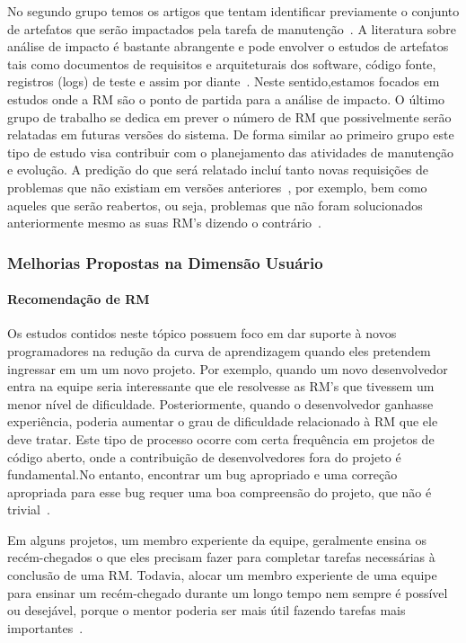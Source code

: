 No segundo grupo temos os artigos que tentam identificar previamente o conjunto
de artefatos que serão impactados pela tarefa de manutenção~\cite{Nagwani2010,
	ahsan2010impact}. A literatura sobre análise de impacto é bastante
abrangente e pode envolver o estudos de artefatos tais como documentos de
requisitos e arquiteturais dos software, código fonte, registros (logs) de teste
e assim por diante~\cite{cavalcanti2014challenges}. Neste sentido,estamos
focados em estudos onde a RM são o ponto de partida para a análise de impacto.
O último grupo de trabalho se dedica em prever o número de RM que possivelmente serão relatadas em futuras versões do sistema. De forma similar ao primeiro
grupo este tipo de estudo visa contribuir com o planejamento das atividades de
manutenção e evolução. A predição do que será relatado incluí tanto novas
requisições de problemas que não existiam em versões
anteriores~\cite{song2006software}, por exemplo, bem como aqueles que serão
reabertos, ou seja, problemas que não foram solucionados anteriormente mesmo as
suas RM's dizendo o contrário~\cite{xia2015automatic}.

\subsubsection{Melhorias Propostas na Dimensão Usuário}
\label{ssub:melhorias_dim_usuario}

\paragraph{Recomendação de RM} Os estudos contidos neste tópico possuem foco em
dar suporte à novos programadores na redução da curva de aprendizagem quando
eles pretendem ingressar em um um novo projeto. Por exemplo, quando um novo
desenvolvedor entra na equipe seria interessante que ele resolvesse as RM's que
tivessem um menor nível de dificuldade. Posteriormente, quando o desenvolvedor
ganhasse experiência, poderia aumentar o grau de dificuldade relacionado à RM
que ele deve tratar. Este tipo de processo ocorre com certa frequência em
projetos de código aberto, onde a contribuição de desenvolvedores fora do
projeto é fundamental.No entanto, encontrar um bug apropriado e uma correção
apropriada para esse bug requer uma boa compreensão do projeto, que não é
trivial~\cite{Wang2011bug}.

Em alguns projetos, um membro experiente da equipe, geralmente ensina os
recém-chegados o que eles precisam fazer para completar tarefas necessárias à
conclusão de uma RM\@. Todavia, alocar um membro experiente de uma equipe para
ensinar um recém-chegado durante um longo tempo nem sempre é possível ou
desejável, porque o mentor poderia ser mais útil fazendo tarefas mais
importantes~\cite{malheiros2012source}.

